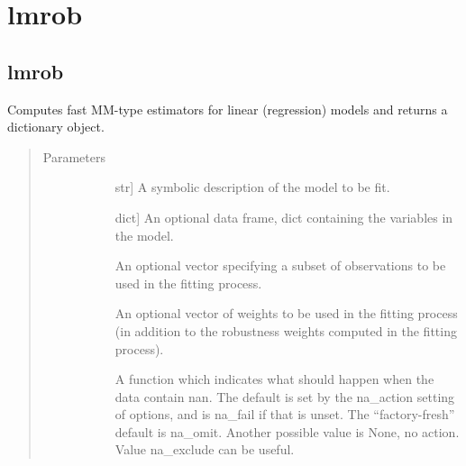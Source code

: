 \documentclass[letterpaper,10pt,english]{sphinxmanual}
\begin{document}
\section{lmrob}
\label{\detokenize{_modules/lmrob:lmrob}}\label{\detokenize{_modules/lmrob:id1}}\label{\detokenize{_modules/lmrob::doc}}\label{\detokenize{_modules/lmrob:module-lmrob}}

\subsection{lmrob}
\label{\detokenize{_modules/lmrob:id2}}

\begin{fulllineitems}
\label{\detokenize{_modules/lmrob:lmrob.lmrob}}
Computes fast MM-type estimators for linear (regression) models  and
returns a dictionary object.
\begin{quote}\begin{description}
\item[{Parameters}] \leavevmode\begin{description}
\item[{}] \leavevmode{[}str{]}
A symbolic description of the model to be fit.

\item[{}] \leavevmode{[}dict{]}
An optional data frame, dict containing the variables in the model.

\item[{}] \leavevmode
An optional vector specifying a subset of observations to be used in the fitting
process.

\item[{}] \leavevmode
An optional vector of weights to be used in the fitting process (in addition to the
robustness weights computed in the fitting process).

\item[{}] \leavevmode
A function which indicates what should happen when the data contain nan. The
default is set by the na\_action setting of options, and is na\_fail if that is
unset. The “factory-fresh”   default is na\_omit. Another possible value is None,
no action. Value na\_exclude can be useful.


\end{description}
\end{description}
\end{quote}
\end{fulllineitems}
\end{document}
